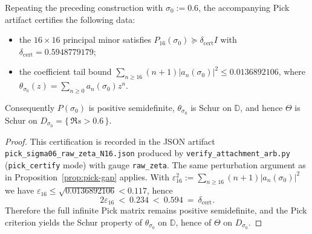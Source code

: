 \documentclass[11pt]{article}
\begin{document}
\begin{proposition}[Certified Pick gap at $\sigma_0=0.6$]\label{prop:pick-gap06}
Repeating the preceding construction with $\sigma_0:=0.6$, the accompanying Pick artifact certifies the following data:
\begin{itemize}
\item the $16\times 16$ principal minor satisfies $P_{16}(\sigma_0)\succeq \delta_{\mathrm{cert}} I$ with $\delta_{\mathrm{cert}}=0.5948779179$;
\item the coefficient tail bound $\sum_{n\ge 16}(n+1)|a_n(\sigma_0)|^2\le 0.0136892106$, where $\theta_{\sigma_0}(z)=\sum_{n\ge 0}a_n(\sigma_0)z^n$.
\end{itemize}
Consequently $P(\sigma_0)$ is positive semidefinite, $\theta_{\sigma_0}$ is Schur on $\mathbb D$, and hence $\Theta$ is Schur on $D_{\sigma_0}=\{\,\Re s>0.6\,\}$.
\end{proposition}
\begin{proof}
This certification is recorded in the JSON artifact \texttt{pick\_sigma06\_raw\_zeta\_N16.json} produced by \texttt{verify\_attachment\_arb.py} (\texttt{pick\_certify} mode) with gauge \texttt{raw\_zeta}.
The same perturbation argument as in Proposition~\ref{prop:pick-gap} applies.
With $\varepsilon_{16}^2:=\sum_{n\ge 16}(n+1)|a_n(\sigma_0)|^2$ we have $\varepsilon_{16}\le \sqrt{0.0136892106}<0.117$, hence
\[
  2\varepsilon_{16}\ <\ 0.234\ <\ 0.594\ =\ \delta_{\mathrm{cert}}.
\]
Therefore the full infinite Pick matrix remains positive semidefinite, and the Pick criterion yields the Schur property of $\theta_{\sigma_0}$ on $\mathbb D$, hence of $\Theta$ on $D_{\sigma_0}$.
\end{proof}
\end{document}
